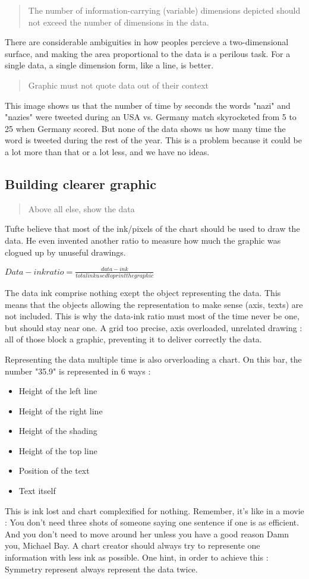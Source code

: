 \begin{quote}
The number of information-carrying (variable) dimensions depicted should not exceed the number of dimensions in the data.
\end{quote}
There are considerable ambiguities in how peoples percieve a two-dimensional surface, and making the area proportional to the data is a perilous task. For a single data, a single dimension form, like a line, is better.

\begin{quote}
Graphic must not quote data out of their context
\end{quote}
This image shows us that the number of time by seconds the words "nazi" and "nazies" were tweeted during an USA vs. Germany match skyrocketed from 5 to 25 when Germany scored.
But none of the data shows us how many time the word is tweeted during the rest of the year. This is a problem because it could be a lot more than that or a lot less, and we have no ideas.

\subsection{Building clearer graphic}
\begin{quote}
Above all else, show the data
\end{quote}

Tufte believe that most of the ink/pixels of the chart should be used to draw the data. He even invented another ratio to measure how much the graphic was clogued up by unuseful drawings.

$Data-ink ratio = \frac{data-ink}{total ink used to print the graphic}$

The data ink comprise nothing exept the object representing the data. This means that the objects allowing the representation to make sense (axis, texts) are not included. 
This is why the data-ink ratio must most of the time never be one, but should stay near one.
A grid too precise, axis overloaded, unrelated drawing : all of those block a graphic, preventing it to deliver correctly the data.

Representing the data multiple time is also orverloading a chart. On this bar, the number "35.9" is represented in 6 ways :
\begin{itemize}
\item Height of the left line
\item Height of the right line
\item Height of the shading
\item Height of the top line
\item Position of the text
\item Text itself
\end{itemize}
This is ink lost and chart complexified for nothing. Remember, it's like in a movie : You don't need three shots of someone saying one sentence if one is as efficient. And you don't need to move around her unless you have a good reason 
 Damn you, Michael Bay.
 A chart creator should always try to represente one information with less ink as possible.
 One hint, in order to achieve this : Symmetry represent always represent the data twice.

